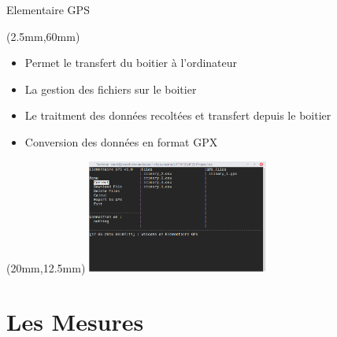 \documentclass[10pt]{beamer}
\begin{document}
	\begin{frame}{Elementaire GPS}
		\begin{textblock*}{80mm}(2.5mm,60mm)
			\begin{itemize}
				\item Permet le transfert du boitier à l'ordinateur 
				\item La gestion des fichiers sur le boitier 
				\item Le traitment des données recoltées et transfert depuis le boitier
				\item Conversion des données en format GPX
			\end{itemize}
		\end{textblock*}

		\begin{textblock*}{80mm}(20mm,12.5mm)
				\includegraphics[width=225px]{elementaire_gps.png}
		\end{textblock*}
		
	\end{frame}

	\section{Les Mesures}
\end{document}
